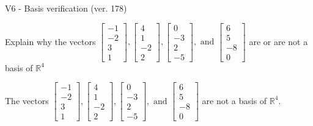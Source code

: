 \begin{exercise}
  \begin{exerciseTitle}V6 - Basis verification (ver. 178)\end{exerciseTitle}
  \begin{exerciseStatement}
    Explain why the vectors \(\left[\begin{array}{r}
-1 \\
-2 \\
3 \\
1
\end{array}\right] , \left[\begin{array}{r}
4 \\
1 \\
-2 \\
2
\end{array}\right] , \left[\begin{array}{r}
0 \\
-3 \\
2 \\
-5
\end{array}\right] , \text{ and } \left[\begin{array}{r}
6 \\
5 \\
-8 \\
0
\end{array}\right]\) are or are not a basis of \(\mathbb{R}^4\)	


  \end{exerciseStatement}
  \begin{exerciseAnswer}
   The vectors \(\left[\begin{array}{r}
-1 \\
-2 \\
3 \\
1
\end{array}\right] , \left[\begin{array}{r}
4 \\
1 \\
-2 \\
2
\end{array}\right] , \left[\begin{array}{r}
0 \\
-3 \\
2 \\
-5
\end{array}\right] , \text{ and } \left[\begin{array}{r}
6 \\
5 \\
-8 \\
0
\end{array}\right]\) 
  	 are not  a basis of \(\mathbb{R}^4\).
  


  \end{exerciseAnswer}
\end{exercise}